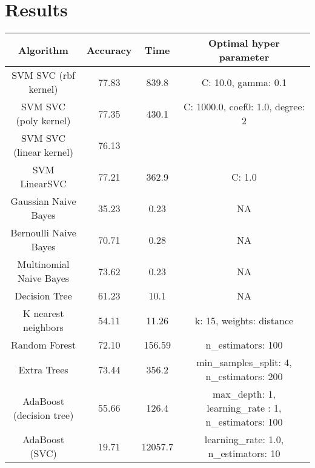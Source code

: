 \section{Results}
\begin{center}
	\begin{tabular}{c|c|c|c}
    \hline
	     Algorithm   & Accuracy & Time & Optimal hyper parameter\\
         \hline
         SVM SVC (rbf kernel)   & 77.83  & 839.8 & C: 10.0, gamma: 0.1\\
         \hline
         SVM SVC (poly kernel)  & 77.35  & 430.1 & C: 1000.0, coef0: 1.0, degree: 2\\
         \hline
         SVM SVC (linear kernel)   &  76.13    &  & \\
         \hline
         SVM LinearSVC    &  77.21   &362.9  & C: 1.0\\
         \hline
         \hline
         Gaussian Naive Bayes & 35.23 & 0.23 & NA \\
         \hline
         Bernoulli Naive Bayes &   70.71    & 0.28  & NA \\
         \hline
         Multinomial Naive Bayes & 73.62 	& 0.23  & NA \\
         \hline
         \hline
         Decision Tree &  61.23 & 10.1 & NA \\
         \hline
         \hline
         K nearest neighbors & 54.11 & 11.26 & k: 15, weights:  distance\\
         \hline
         \hline
         Random Forest & 72.10 & 156.59 & n\_estimators: 100\\
         \hline
         Extra Trees & 73.44 & 356.2 &
         min\_samples\_split: 4,
         n\_estimators: 200 \\
         \hline
         AdaBoost (decision tree) & 55.66 & 126.4 & max\_depth: 1, learning\_rate : 1, n\_estimators: 100\\
         \hline
         AdaBoost (SVC) & 19.71 & 12057.7 & learning\_rate: 1.0,
         n\_estimators: 10\\
         \hline
        
          \end{tabular}
\end{center}